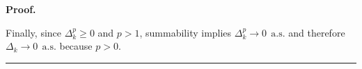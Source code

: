 \documentclass[11pt,a4paper]{article}
\newtheorem{lemma}{Lemma}[section]
\newenvironment{proof}[1][Proof]{%
  \par\noindent\textbf{#1.}\ %
}{%
  \par\vspace{-0.5 ex}            %
  \noindent\hfill\rule{0.5em}{0.5em}\par
  \vspace{1ex}
}
\newcommand{\tdelta}{\Delta}
\newcommand{\Dexp}{p}
\begin{document}
\begin{proof}
Finally, since $\Delta_k^{\Dexp}\ge0$ and $p>1$, summability implies
\(
    \Delta_k^{\Dexp}\to0
    \ \ \text{a.s.}
\)
and therefore
\(
    \Delta_k\to0
    \ \ \text{a.s.}
\)
because $\Dexp>0$.
\end{proof}
\noindent
\end{document}
